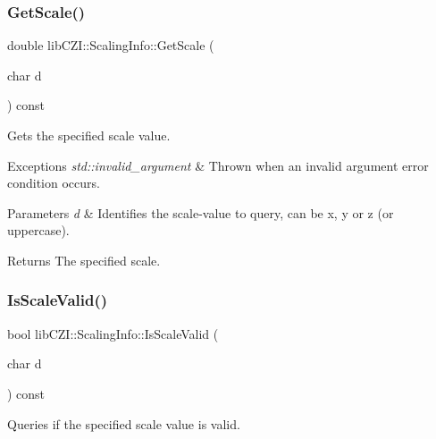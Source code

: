 \subsubsection{\texorpdfstring{Get\+Scale()}{GetScale()}}
{\footnotesize\ttfamily double lib\+C\+Z\+I\+::\+Scaling\+Info\+::\+Get\+Scale (\begin{DoxyParamCaption}\item[{char}]{d }\end{DoxyParamCaption}) const\hspace{0.3cm}{\ttfamily [inline]}}

Gets the specified scale value.


\begin{DoxyExceptions}{Exceptions}
{\em std\+::invalid\+\_\+argument} & Thrown when an invalid argument error condition occurs.\\
\hline
\end{DoxyExceptions}

\begin{DoxyParams}{Parameters}
{\em d} & Identifies the scale-\/value to query, can be \textquotesingle{}x\textquotesingle{}, \textquotesingle{}y\textquotesingle{} or \textquotesingle{}z\textquotesingle{} (or uppercase).\\
\hline
\end{DoxyParams}
\begin{DoxyReturn}{Returns}
The specified scale. 
\end{DoxyReturn}
\mbox{\label{structlib_c_z_i_1_1_scaling_info_ac94956ea0d31786520641798ed76c556}} 
\subsubsection{\texorpdfstring{Is\+Scale\+Valid()}{IsScaleValid()}}
{\footnotesize\ttfamily bool lib\+C\+Z\+I\+::\+Scaling\+Info\+::\+Is\+Scale\+Valid (\begin{DoxyParamCaption}\item[{char}]{d }\end{DoxyParamCaption}) const\hspace{0.3cm}{\ttfamily [inline]}}

Queries if the specified scale value is valid.


